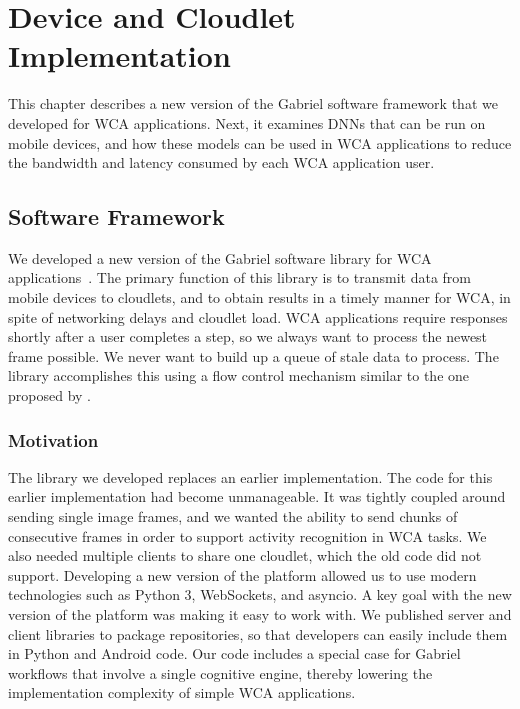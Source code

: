 \chapter{Device and Cloudlet Implementation}\label{chap:implementation}

This chapter describes a new version of the Gabriel software framework that we
developed for WCA applications.
Next, it examines DNNs that can be run on mobile devices, and how
these models can be used in WCA applications to reduce the bandwidth and
latency consumed by each WCA application user.

\section{Software Framework}

We developed a new version of the Gabriel software library for WCA
applications~{\cite{gabriel_github}}.
The primary function of this library is to transmit data from mobile
devices to cloudlets, and to obtain results in a timely manner for WCA, in
spite of networking delays and cloudlet load.
WCA applications require responses shortly after a user completes a step, so
we always want to process the newest frame possible. We never want to build up
a queue of stale data to process. The library accomplishes this using a flow
control mechanism similar to the one proposed by \citet{ha2014}.

\subsection{Motivation}

The library we developed replaces an earlier implementation.
The code for this earlier implementation had become unmanageable.
It was tightly coupled around sending single image frames, and we
wanted the ability to send chunks of consecutive frames in order to support
activity recognition in WCA tasks.
We also needed multiple clients to share one cloudlet, which the old code did
not support.
Developing a new version of the platform allowed us to use modern technologies
such as Python 3, WebSockets, and asyncio.
A key goal with the new version of the platform was making it easy to work with.
We published server and client libraries to package repositories, so that
developers can easily include them in Python and Android code.
Our code includes a special case for Gabriel workflows that involve a single
cognitive engine, thereby lowering the implementation complexity of simple WCA
applications.

